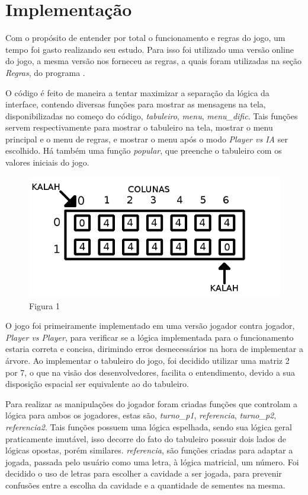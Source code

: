 \documentclass[a4paper, 12pt]{article}
\begin{document}
	\section{Implementação}
		Com o propósito de entender por total o funcionamento e regras do jogo, um tempo foi gasto realizando seu estudo. Para isso foi utilizado uma versão online do jogo, a mesma versão nos forneceu as regras, a quais foram utilizadas na seção \emph{Regras}, do programa \cite{mancalaOnline}.

		O código é feito de maneira a tentar maximizar a separação da lógica da interface, contendo diversas funções para mostrar as mensagens na tela, disponibilizadas no começo do código, \emph{tabuleiro}, \emph{menu}, \emph{menu\_dific}. Tais funções servem respectivamente para mostrar o tabuleiro na tela, mostrar o menu principal e o menu de regras, e mostrar o menu após o modo \emph{Player vs IA} ser escolhido. Há também uma função \emph{popular}, que preenche o tabuleiro com os valores iniciais do jogo.

		\begin{figure}[H]
                \centering
                \includegraphics[scale=0.5]{Figura1.png}
                \caption{Figura 1}
        \end{figure}

		O jogo foi primeiramente implementado em uma versão jogador contra jogador, \emph{Player vs Player}, para verificar se a lógica implementada para o funcionamento estaria correta e concisa, dirimindo erros desnecessários na hora de implementar a árvore. Ao implementar o tabuleiro do jogo, foi decidido utilizar uma matriz 2 por 7, o que na visão dos desenvolvedores, facilita o entendimento, devido a sua disposição espacial ser equivalente ao do tabuleiro.

		Para realizar as manipulações do jogador foram criadas funções que controlam a lógica para ambos os jogadores, estas são, \emph{turno\_p1}, \emph{referencia}, \emph{turno\_p2}, \emph{referencia2}. Tais funções possuem uma lógica espelhada, sendo sua lógica geral praticamente imutável, isso decorre do fato do tabuleiro possuir dois lados de lógicas opostas, porém similares. \emph{referencia}, são funções criadas para adaptar a jogada, passada pelo usuário como uma letra, à lógica matricial, um número. Foi decidido o uso de letras para escolher a cavidade a ser jogada, para prevenir confusões entre a escolha da cavidade e a quantidade de sementes na mesma.
\end{document}
